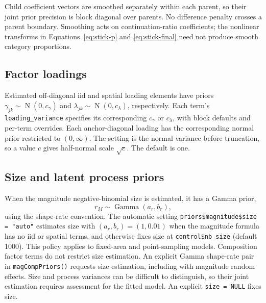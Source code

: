 \documentclass[11pt]{article}
\newcommand{\Normal}{\operatorname{N}}
\begin{document}
Child coefficient vectors are smoothed separately within each parent, so their
joint prior precision is block diagonal over parents. No difference penalty
crosses a parent boundary. Smoothing acts on continuation-ratio coefficients;
the nonlinear transforms in Equations~\ref{eq:stick-p} and
\ref{eq:stick-final} need not produce smooth category proportions.

\subsection{Factor loadings}

Estimated off-diagonal iid and spatial loading elements have
priors \(\gamma_{jk}\sim\Normal(0,c_\gamma)\) and
\(\lambda_{jk}\sim\Normal(0,c_\lambda)\), respectively. Each term's
\texttt{loading\_variance} specifies its corresponding \(c_\gamma\) or
\(c_\lambda\), with block defaults and per-term overrides. Each anchor-diagonal
loading has the corresponding normal prior restricted to \((0,\infty)\).
The setting is the normal variance before truncation, so a value \(c\)
gives half-normal scale \(\sqrt c\). The default is one.

\subsection{Size and latent process priors}
\label{sec:size-priors}

When the magnitude negative-binomial size is estimated, it has a Gamma prior,
\begin{equation}
  r_M \sim \operatorname{Gamma}(a_r,b_r),
  \label{eq:nb-size-prior}
\end{equation}
using the shape-rate convention. The automatic setting
\texttt{priors\$magnitude\$size = "auto"} estimates size with
\((a_r,b_r)=(1,0.01)\) when the magnitude formula has no iid or spatial
terms, and otherwise fixes size at \texttt{control\$nb\_size} (default 1000).
This policy applies to fixed-area and point-sampling models. Composition
factor terms do not restrict size estimation.
An explicit Gamma shape-rate pair in \texttt{magCompPriors()} requests size
estimation, including with magnitude random effects. Size and process
variances can be difficult to distinguish, so their joint estimation requires
assessment for the fitted model. An explicit \texttt{size = NULL} fixes size.
\end{document}
